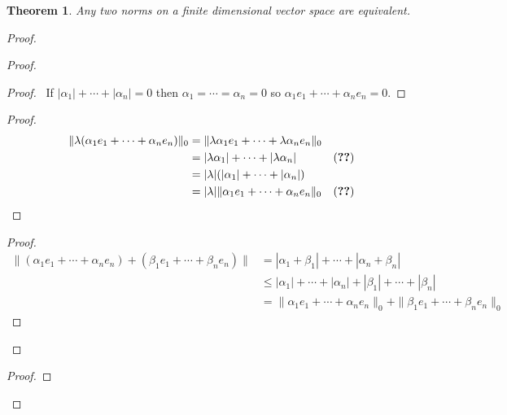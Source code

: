 \documentclass{book}
\newtheorem{thm}[ax]{Theorem}
\theoremstyle{definition}
\begin{document}
\begin{thm}
\label{thm:findimeqnorm}
Any two norms on a finite dimensional vector space are equivalent.
\end{thm}

\begin{proof}
\pf
{}
\begin{proof}
	\begin{proof}
		\pf\ If $|\alpha_1| + \cdots + |\alpha_n| = 0$ then $\alpha_1 = \cdots = \alpha_n = 0$ so $\alpha_1 e_1 + \cdots + \alpha_n e_n = 0$.
	\end{proof}
	\begin{proof}
		\pf
		\begin{align*}
			\|\lambda (\alpha_1 e_1 + \cdots + \alpha_n e_n)\|_0
			& = \|\lambda \alpha_1 e_1 + \cdots + \lambda \alpha_n e_n\|_0 \\
			& = |\lambda \alpha_1| + \cdots + |\lambda \alpha_n| & (\text{\stepref{3}}) \\
			& = |\lambda| (|\alpha_1| + \cdots + |\alpha_n|) \\
			& = |\lambda| \|\alpha_1 e_1 + \cdots + \alpha_n e_n\|_0 & (\text{\stepref{3}})
		\end{align*}
	\end{proof}
	\begin{proof}
		\pf
		\begin{align*}
			\|(\alpha_1 e_1 + \cdots + \alpha_n e_n) + (\beta_1 e_1 + \cdots + \beta_n e_n)\|
			& = |\alpha_1 + \beta_1| + \cdots + |\alpha_n + \beta_n| \\
			& \leq |\alpha_1| + \cdots + |\alpha_n| + |\beta_1| + \cdots + |\beta_n| \\
			& = \|\alpha_1 e_1 + \cdots + \alpha_n e_n\|_0 + \|\beta_1 e_1 + \cdots + \beta_n e_n\|_0
		\end{align*}
	\end{proof}
\end{proof}
\begin{proof}

\end{proof}
\end{proof}
\end{document}
